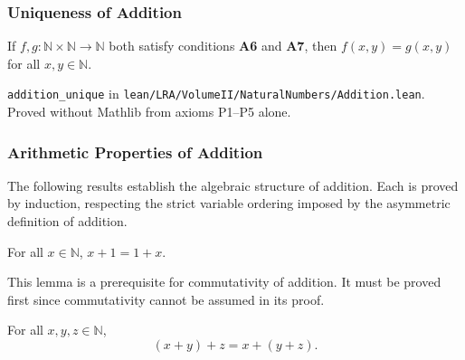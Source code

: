 \subsubsection*{Uniqueness of Addition}

\begin{theorem}
\label{thm:landau-addition-unique}
If $f, g : \mathbb{N} \times \mathbb{N} \to \mathbb{N}$ both satisfy
conditions \textbf{A6} and \textbf{A7}, then $f(x,y) = g(x,y)$ for
all $x, y \in \mathbb{N}$.
\end{theorem}

\begin{remark*}
\texttt{addition\_unique} in
\texttt{lean/LRA/VolumeII/NaturalNumbers/Addition.lean}.
Proved without Mathlib from axioms P1--P5 alone.
\end{remark*}

\subsubsection*{Arithmetic Properties of Addition}

The following results establish the algebraic structure of addition.
Each is proved by induction, respecting the strict variable ordering
imposed by the asymmetric definition of addition.

\begin{lemma}
\label{lem:landau-succ-comm}
For all $x \in \mathbb{N}$, $x + 1 = 1 + x$.
\end{lemma}

\begin{remark*}
This lemma is a prerequisite for commutativity of addition. It must be
proved first since commutativity cannot be assumed in its proof.
\end{remark*}

\begin{theorem}
\label{thm:landau-plus-assoc}
For all $x, y, z \in \mathbb{N}$,
\[
  (x + y) + z = x + (y + z).
\]
\end{theorem}

